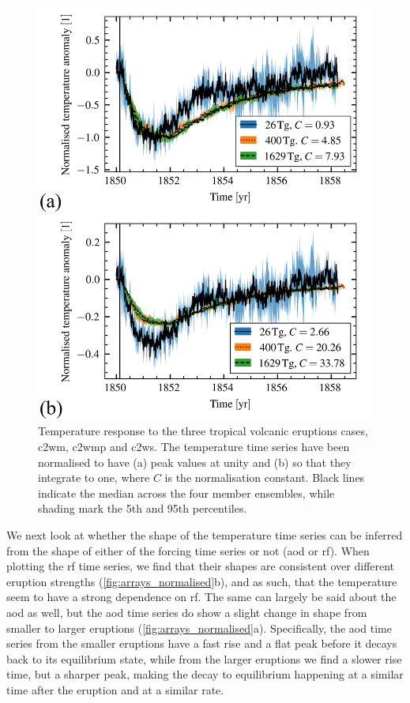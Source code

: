 \documentclass{ametsocV6.1}
\begin{document}
\begin{figure}
  \centering
  \includegraphics[width=0.95\linewidth]{figures/compare-waveform.png}

  \caption{Temperature response to the three tropical volcanic eruptions cases,
    \gls{c2wm}, \gls{c2wmp} and \gls{c2ws}. The temperature time series have been normalised
    to have (a) peak values at unity and (b) so that they integrate to one, where \(C\) is
    the normalisation constant. Black lines indicate the median across the four member
    ensembles, while shading mark the 5th and 95th percentiles.}\label{fig:compare-waveform}%
\end{figure}

We next look at whether the shape of the temperature time series can be inferred from
the shape of either of the forcing time series or not (\gls{aod} or \gls{rf}). When
plotting the \gls{rf} time series, we find that their shapes are consistent over
different eruption strengths (\ref{fig:arrays_normalised}b), and as such, that the
temperature seem to have a strong dependence on \gls{rf}. The same can largely be said
about the \gls{aod} as well, but the \gls{aod} time series do show a slight change in
shape from smaller to larger eruptions (\ref{fig:arrays_normalised}a). Specifically, the
\gls{aod} time series from the smaller eruptions have a fast rise and a flat peak before
it decays back to its equilibrium state, while from the larger eruptions we find a
slower rise time, but a sharper peak, making the decay to equilibrium happening at a
similar time after the eruption and at a similar rate.
\end{document}
